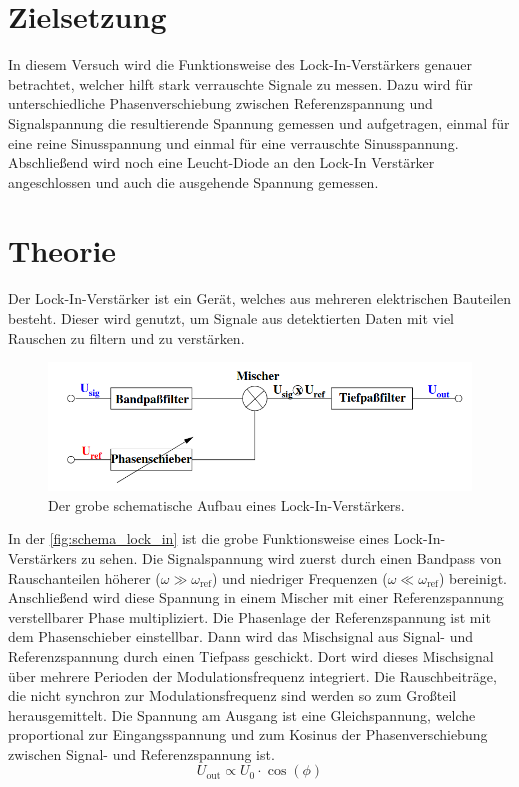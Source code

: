 \section{Zielsetzung}
\label{sec:Zielsetzung}

    In diesem Versuch wird die Funktionsweise des Lock-In-Verstärkers genauer betrachtet, welcher hilft stark verrauschte Signale zu messen.
    Dazu wird für unterschiedliche Phasenverschiebung zwischen Referenzspannung und Signalspannung die resultierende Spannung gemessen und 
    aufgetragen, einmal für eine reine Sinusspannung und einmal für eine verrauschte Sinusspannung. Abschließend wird noch eine Leucht-Diode
    an den Lock-In Verstärker angeschlossen und auch die ausgehende Spannung gemessen. 

\section{Theorie}
\label{sec:Theorie}

    Der Lock-In-Verstärker ist ein Gerät, welches aus mehreren elektrischen Bauteilen besteht. Dieser wird genutzt, um Signale aus detektierten Daten mit viel 
    Rauschen zu filtern und zu verstärken. %

    \begin{figure}
        \centering
        \includegraphics[width=\textwidth]{bilder/schema_lock_in.png}
        \caption{Der grobe schematische Aufbau eines Lock-In-Verstärkers.}
        \label{fig:schema_lock_in}
    \end{figure}

    \noindent In der \autoref{fig:schema_lock_in} ist die grobe Funktionsweise eines Lock-In-Verstärkers zu sehen. Die Signalspannung wird zuerst durch einen Bandpass von
    Rauschanteilen höherer ($\omega \gg \omega_{\text{ref}}$) und niedriger Frequenzen ($\omega \ll \omega_{\text{ref}}$) bereinigt. Anschließend wird diese Spannung in 
    einem Mischer mit einer Referenzspannung verstellbarer Phase multipliziert. Die Phasenlage der Referenzspannung ist mit dem Phasenschieber einstellbar. 
    Dann wird das Mischsignal aus Signal- und Referenzspannung durch einen Tiefpass geschickt. Dort wird dieses Mischsignal über mehrere Perioden der Modulationsfrequenz integriert.
    Die Rauschbeiträge, die nicht synchron zur Modulationsfrequenz sind werden so zum Großteil herausgemittelt. Die Spannung am Ausgang ist eine Gleichspannung, welche 
    proportional zur Eingangsspannung und zum Kosinus der Phasenverschiebung zwischen Signal- und Referenzspannung ist.
    \begin{equation*}
        U_{\text{out}} \propto U_0 \cdot \cos(\phi)
    \end{equation*}

